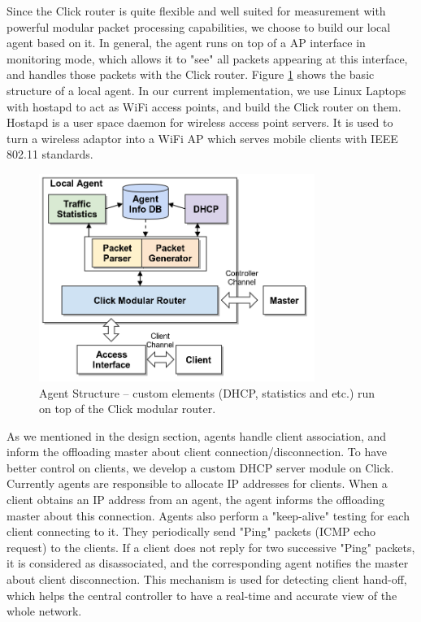 \documentclass[english]{tktltiki}
\begin{document}
Since the Click router is quite flexible and well suited for measurement with powerful modular packet processing capabilities, we choose to build our local agent based on it. In general, the agent runs on top of a AP interface in monitoring mode, which allows it to "see" all packets appearing at this interface, and handles those packets with the Click router. Figure \ref{fig:agent} shows the basic structure of a local agent. In our current implementation, we use Linux Laptops with hostapd to act as WiFi access points, and build the Click router on them. Hostapd is a user space daemon for wireless access point servers. It is used to turn a wireless adaptor into a WiFi AP which serves mobile clients with IEEE 802.11 standards.

\begin{figure}[htbp]
  \centering
  \includegraphics[width=0.8\textwidth]{images/agent.png}
  \caption{Agent Structure -- custom elements (DHCP, statistics and etc.) run on top of the Click modular router.}
  \label{fig:agent}
\end{figure}

As we mentioned in the design section, agents handle client association, and inform the offloading master about client connection/disconnection. To have better control on clients, we develop a custom DHCP server module on Click. Currently agents are responsible to allocate IP addresses for clients. When a client obtains an IP address from an agent, the agent informs the offloading master about this connection. Agents also perform a "keep-alive" testing for each client connecting to it. They periodically send "Ping" packets (ICMP echo request) to the clients. If a client does not reply for two successive "Ping" packets, it is considered as disassociated, and the corresponding agent notifies the master about client disconnection. This mechanism is used for detecting client hand-off, which helps the central controller to have a real-time and accurate view of the whole network.
\end{document}
